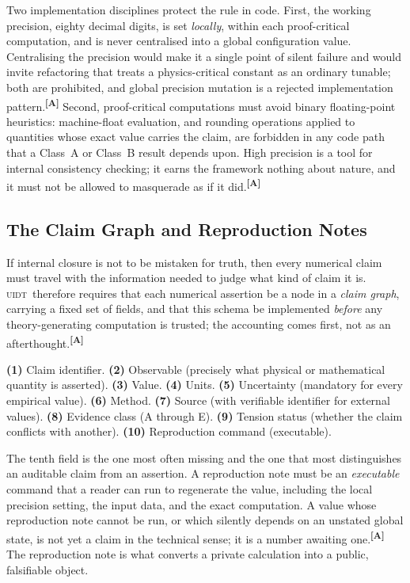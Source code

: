 \documentclass[12pt,a4paper,twoside]{article}
\theoremstyle{plain}
\theoremstyle{definition}
\theoremstyle{remark}
\newcommand{\UIDT}{\textsc{uidt}}
\newcommand{\catmark}[1]{\textsuperscript{\textsf{\textbf{[#1]}}}}
\begin{document}
Two implementation disciplines protect the rule in code. First, the working precision, eighty decimal digits, is set \emph{locally}, within each proof-critical computation, and is never centralised into a global configuration value. Centralising the precision would make it a single point of silent failure and would invite refactoring that treats a physics-critical constant as an ordinary tunable; both are prohibited, and global precision mutation is a rejected implementation pattern.\catmark{A} Second, proof-critical computations must avoid binary floating-point heuristics: machine-float evaluation, and rounding operations applied to quantities whose exact value carries the claim, are forbidden in any code path that a Class~A or Class~B result depends upon. High precision is a tool for internal consistency checking; it earns the framework nothing about nature, and it must not be allowed to masquerade as if it did.\catmark{A}

\subsection{The Claim Graph and Reproduction Notes}
\label{subsec:claim-graph}

If internal closure is not to be mistaken for truth, then every numerical claim must travel with the information needed to judge what kind of claim it is. \UIDT\ therefore requires that each numerical assertion be a node in a \emph{claim graph}, carrying a fixed set of fields, and that this schema be implemented \emph{before} any theory-generating computation is trusted; the accounting comes first, not as an afterthought.\catmark{A}

\begin{governancebox}
\textbf{(1)} Claim identifier. \quad \textbf{(2)} Observable (precisely what physical or mathematical quantity is asserted). \quad \textbf{(3)} Value. \quad \textbf{(4)} Units. \quad \textbf{(5)} Uncertainty (mandatory for every empirical value). \quad \textbf{(6)} Method. \quad \textbf{(7)} Source (with verifiable identifier for external values). \quad \textbf{(8)} Evidence class (A through E). \quad \textbf{(9)} Tension status (whether the claim conflicts with another). \quad \textbf{(10)} Reproduction command (executable).
\end{governancebox}

\noindent The tenth field is the one most often missing and the one that most distinguishes an auditable claim from an assertion. A reproduction note must be an \emph{executable} command that a reader can run to regenerate the value, including the local precision setting, the input data, and the exact computation. A value whose reproduction note cannot be run, or which silently depends on an unstated global state, is not yet a claim in the technical sense; it is a number awaiting one.\catmark{A} The reproduction note is what converts a private calculation into a public, falsifiable object.
\end{document}
